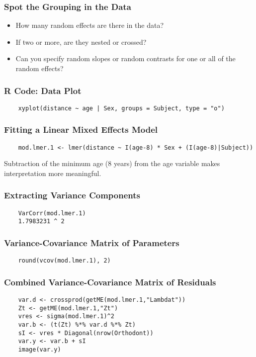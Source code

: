 \documentclass{beamer}
\begin{document}
\begin{frame}
    \frametitle{Spot the Grouping in the Data}
    \begin{itemize}
        \item How many random effects are there in the data?
        \item If two or more, are they nested or crossed?
        \item Can you specify random slopes or random contrasts for one or all of the random effects?
    \end{itemize}
\end{frame}

\begin{frame}[fragile]
    \frametitle{R Code: Data Plot}
    \lstset{style=Rstyle}
    \begin{lstlisting}
    xyplot(distance ~ age | Sex, groups = Subject, type = "o")
    \end{lstlisting}
\end{frame}

\begin{frame}[fragile]
    \frametitle{Fitting a Linear Mixed Effects Model}
    \lstset{style=Rstyle}
    \begin{lstlisting}
    mod.lmer.1 <- lmer(distance ~ I(age-8) * Sex + (I(age-8)|Subject))
    \end{lstlisting}
    Subtraction of the minimum age (8 years) from the age variable makes interpretation more meaningful.
\end{frame}

\begin{frame}[fragile]
    \frametitle{Extracting Variance Components}
    \lstset{style=Rstyle}
    \begin{lstlisting}
    VarCorr(mod.lmer.1)
    1.7983231 ^ 2
    \end{lstlisting}
\end{frame}

\begin{frame}[fragile]
    \frametitle{Variance-Covariance Matrix of Parameters}
    \lstset{style=Rstyle}
    \begin{lstlisting}
    round(vcov(mod.lmer.1), 2)
    \end{lstlisting}
\end{frame}

\begin{frame}[fragile]
    \frametitle{Combined Variance-Covariance Matrix of Residuals}
    \lstset{style=Rstyle}
    \begin{lstlisting}
    var.d <- crossprod(getME(mod.lmer.1,"Lambdat"))
    Zt <- getME(mod.lmer.1,"Zt")
    vres <- sigma(mod.lmer.1)^2
    var.b <- (t(Zt) %*% var.d %*% Zt)
    sI <- vres * Diagonal(nrow(Orthodont))
    var.y <- var.b + sI
    image(var.y)
    \end{lstlisting}
\end{frame}
\end{document}
